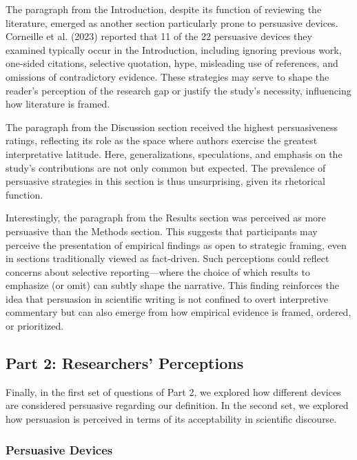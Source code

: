\documentclass[authordate, meta]{jote-new-article}
\begin{document}
	The paragraph from the Introduction, despite its function of reviewing the literature, emerged as another section particularly prone to persuasive devices. Corneille et al. (2023) reported that 11 of the 22 persuasive devices they examined typically occur in the Introduction, including ignoring previous work, one-sided citations, selective quotation, hype, misleading use of references, and omissions of contradictory evidence. These strategies may serve to shape the reader's perception of the research gap or justify the study's necessity, influencing how literature is framed.



	The paragraph from the Discussion section received the highest persuasiveness ratings, reflecting its role as the space where authors exercise the greatest interpretative latitude. Here, generalizations, speculations, and emphasis on the study's contributions are not only common but expected. The prevalence of persuasive strategies in this section is thus unsurprising, given its rhetorical function.



	Interestingly, the paragraph from the Results section was perceived as more persuasive than the Methods section. This suggests that participants may perceive the presentation of empirical findings as open to strategic framing, even in sections traditionally viewed as fact-driven. Such perceptions could reflect concerns about selective reporting—where the choice of which results to emphasize (or omit) can subtly shape the narrative. This finding reinforces the idea that persuasion in scientific writing is not confined to overt interpretive commentary but can also emerge from how empirical evidence is framed, ordered, or prioritized.



	\subsection{Part 2: Researchers' Perceptions}



	Finally, in the first set of questions of Part 2, we explored how different devices are considered persuasive regarding our definition. In the second set, we explored how persuasion is perceived in terms of its acceptability in scientific discourse.



	\subsubsection{Persuasive Devices}
\end{document}
